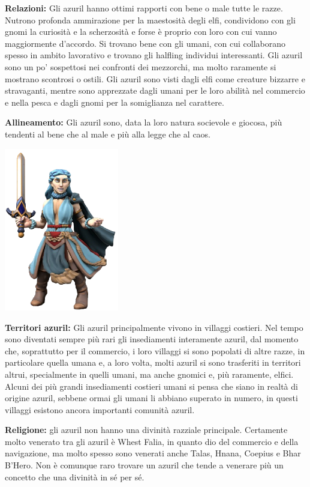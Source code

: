 \documentclass[10pt, a4paper]{report}
\begin{document}
\begin{multicols}{2}
\textbf{Relazioni:} Gli azuril hanno ottimi rapporti con bene o male tutte le razze. Nutrono profonda ammirazione per la maestosità degli elfi, condividono con gli gnomi la curiosità e la scherzosità e forse è proprio con loro con cui vanno maggiormente d’accordo. Si trovano bene con gli umani, con cui collaborano spesso in ambito lavorativo e trovano gli halfling individui interessanti. Gli azuril sono un po’ sospettosi nei confronti dei mezzorchi, ma molto raramente si mostrano scontrosi o ostili. Gli azuril sono visti dagli elfi come creature bizzarre e stravaganti, mentre sono apprezzate dagli umani per le loro abilità nel commercio e nella pesca e dagli gnomi per la somiglianza nel carattere.

\textbf{Allineamento:} Gli azuril sono, data la loro natura socievole e giocosa, più tendenti al bene che al male e più alla legge che al caos.

\begin{center}
	\includegraphics[width=5cm]{azuril.png}
\end{center}

\textbf{Territori azuril:} Gli azuril principalmente vivono in villaggi costieri. Nel tempo sono diventati sempre più rari gli insediamenti interamente azuril, dal momento che, soprattutto per il commercio, i loro villaggi si sono popolati di altre razze, in particolare quella umana e, a loro volta, molti azuril si sono trasferiti in territori altrui, specialmente in quelli umani, ma anche gnomici e, più raramente, elfici. Alcuni dei più grandi insediamenti costieri umani si pensa che siano in realtà di origine azuril, sebbene ormai gli umani li abbiano superato in numero, in questi villaggi esistono ancora importanti comunità azuril.

\textbf{Religione:} gli azuril non hanno una divinità razziale principale. Certamente molto venerato tra gli azuril è Whest Falia, in quanto dio del commercio e della navigazione, ma molto spesso sono venerati anche Talas, Hnana, Coepius e Bhar B’Hero. Non è comunque raro trovare un azuril che tende a venerare più un concetto che una divinità in sé per sé.


\end{multicols}
\end{document}

